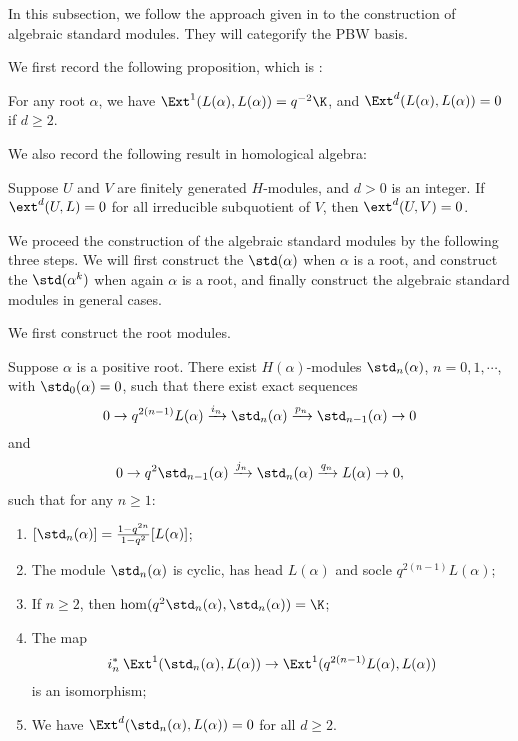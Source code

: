 In this subsection, we follow the approach given
in \cite{BKM} to the construction of algebraic standard modules. They will
categorify the PBW basis. 

We first record the following proposition, which is 
\cite[Theorem 3.1]{BKM}:

\begin{proposition}\label{ext-of-cuspidal}
    For any root $\alpha$, we have
    $\Ext^1(L(\alpha),L(\alpha)) = q^{-2}\K$, and
    $\Ext^d(L(\alpha),L(\alpha)) = 0$ if $d\ge 2$.
\end{proposition}

We also record the following result in homological algebra:

\begin{proposition}\label{ext-of-subquo}
    Suppose $U$ and $V$ are finitely generated $H$-modules, and $d>0$ is an integer.
    If $\ext^d(U,L) = 0$ for all irreducible subquotient of $V$,
    then $\ext^d(U,V) = 0$.
\end{proposition}

We proceed the construction of the algebraic standard modules by the following three steps.
We will first construct the  $\std(\alpha)$
when $\alpha$ is a root, and construct the  $\std(\alpha^k)$
when again $\alpha$ is a root, and finally construct
the algebraic standard modules in general cases.

We first construct the root modules.

\begin{lemma}\label{filtr-of-std}
    Suppose $\alpha$ is a positive root.
    There exist $H(\alpha)$-modules $\std_n(\alpha)$,
    $n = 0,1,\cdots$, with $\std_0(\alpha) = 0$, such that 
    there exist exact sequences 
    \begin{equation}\label{exact-1}0\to q^{2(n-1)}L(\alpha)\xrightarrow{i_n}
    \std_n(\alpha)\xrightarrow{p_n}\std_{n-1}(\alpha)\to 0\end{equation}
    and \begin{equation}\label{exact-2}0\to q^2\std_{n-1}(\alpha)\xrightarrow{j_n}
    \std_n(\alpha)\xrightarrow{q_n} L(\alpha)\to 0,\end{equation}
    such that for any $n\ge 1$:
    \begin{enumerate}[1)]
        \item $[\std_n(\alpha)] = \frac{1-q^{2n}}{1-q^2}[L(\alpha)]$;
        \item The module $\std_n(\alpha)$ is cyclic, has head $L(\alpha)$
        and socle $q^{2(n-1)}L(\alpha)$;
        \item If $n\ge 2$, then $\hom(q^2\std_n(\alpha),
        \std_n(\alpha)) = \K$;
        \item The map 
        \[ 
            i_n^*\:\Ext^1(\std_n(\alpha),L(\alpha))
            \to\Ext^1(q^{2(n-1)}L(\alpha),L(\alpha))
        \] 
        is an isomorphism;
        \item We have $\Ext^d(\std_n(\alpha),L(\alpha)) = 0$ for all $d\ge 2$.
    \end{enumerate}
\end{lemma}

